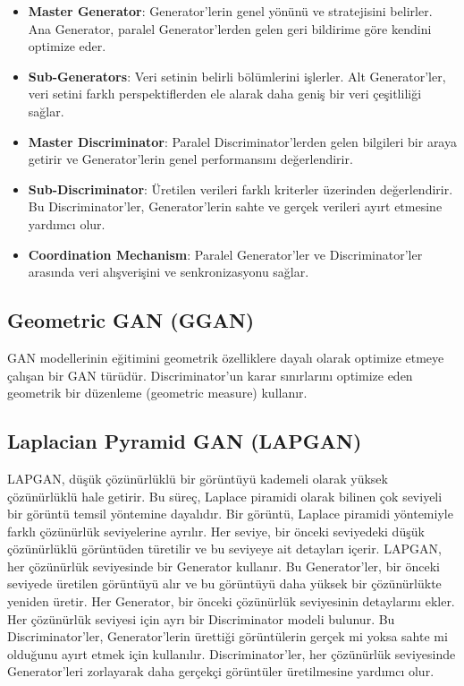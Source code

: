 \begin{itemize}
    \item \textbf{Master Generator}: Generator'lerin genel yönünü ve stratejisini belirler. Ana Generator, paralel Generator'lerden gelen geri bildirime göre kendini optimize eder.
    \item \textbf{Sub-Generators}: Veri setinin belirli bölümlerini işlerler. Alt Generator'ler, veri setini farklı perspektiflerden ele alarak daha geniş bir veri çeşitliliği sağlar.
    \item \textbf{Master Discriminator}: Paralel Discriminator'lerden gelen bilgileri bir araya getirir ve Generator'lerin genel performansını değerlendirir.
    \item \textbf{Sub-Discriminator}: Üretilen verileri farklı kriterler üzerinden değerlendirir. Bu Discriminator'ler, Generator'lerin sahte ve gerçek verileri ayırt etmesine yardımcı olur.
    \item \textbf{Coordination Mechanism}: Paralel Generator'ler ve Discriminator'ler arasında veri alışverişini ve senkronizasyonu sağlar.
\end{itemize}

\newpage

\subsection{Geometric GAN (GGAN)}

GAN modellerinin eğitimini geometrik özelliklere dayalı olarak optimize etmeye çalışan bir GAN türüdür. Discriminator'un karar sınırlarını optimize eden geometrik bir düzenleme (geometric measure) kullanır. 

\newpage

\subsection{Laplacian Pyramid GAN (LAPGAN)}

LAPGAN, düşük çözünürlüklü bir görüntüyü kademeli olarak yüksek çözünürlüklü hale getirir. Bu süreç, Laplace piramidi olarak bilinen çok seviyeli bir görüntü temsil yöntemine dayalıdır. Bir görüntü, Laplace piramidi yöntemiyle farklı çözünürlük seviyelerine ayrılır. Her seviye, bir önceki seviyedeki düşük çözünürlüklü görüntüden türetilir ve bu seviyeye ait detayları içerir. LAPGAN, her çözünürlük seviyesinde bir Generator kullanır. Bu Generator'ler, bir önceki seviyede üretilen görüntüyü alır ve bu görüntüyü daha yüksek bir çözünürlükte yeniden üretir. Her Generator, bir önceki çözünürlük seviyesinin detaylarını ekler. Her çözünürlük seviyesi için ayrı bir Discriminator modeli bulunur. Bu Discriminator'ler, Generator'lerin ürettiği görüntülerin gerçek mi yoksa sahte mi olduğunu ayırt etmek için kullanılır. Discriminator'ler, her çözünürlük seviyesinde Generator'leri zorlayarak daha gerçekçi görüntüler üretilmesine yardımcı olur. 

